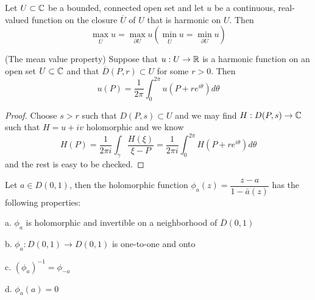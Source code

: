 \begin{corollary}
    Let $U\subset \mathbb{C}$ be a bounded, connected open set and let $u$ be a continuous, real-valued function on the closure $\overline{U}$ of $U$ that is harmonic on $U$. Then
    \[\max_{\overline{U}} u = \max_{\partial U} u(\min_{\overline{U}} u = \min_{\partial U} u)\]
\end{corollary}

\begin{theorem}
    (The mean value property) Suppose that $u:U\to\mathbb{R}$ is a harmonic function on an open set $U\subset\mathbb{C}$ and that $\overline{D}(P,r) \subset U$ for some $r>0$. Then
    \[u(P) = \dfrac{1}{2\pi} \int_0^{2\pi} u(P+re^{i\theta})d\theta\]
\end{theorem}
\begin{proof}
    Choose $s>r$ such that $D(P,s)\subset U$ and we may find $H:D(P,s) \to \mathbb{C}$ such that $H= u+iv$ holomorphic and we know
    \[H(P) = \dfrac{1}{2\pi i }\int_{\gamma}\dfrac{H(\xi)}{\xi-P} = \dfrac{1}{2\pi i}\int_0^{2\pi} H(P+re^{i\theta}) d\theta\]
    and the rest is easy to be checked.
\end{proof}

\begin{lemma}
    Let $a\in D(0,1)$, then the holomorphic function $\phi_a(z) = \dfrac{z-a}{1-\bar{a}(z)}$ has the following properties:\par
    a. $\phi_a$ is holomorphic and invertible on a neighborhood of $\overline{D}(0,1)$\par
    b. $\phi_a:D(0,1)\to D(0,1)$ is one-to-one and onto\par
    c. $(\phi_a)^{-1} = \phi_{-a}$\par
    d. $\phi_a(a) = 0$
\end{lemma}

